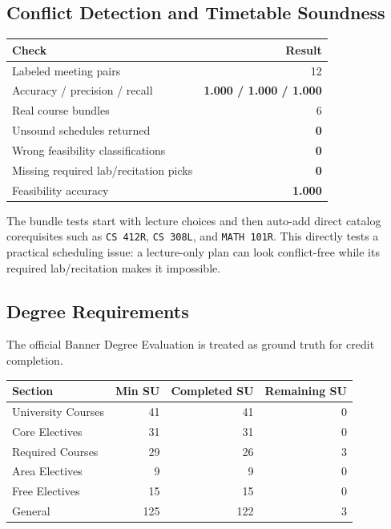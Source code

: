 \documentclass[10pt,letterpaper]{article}
\newcommand{\code}[1]{\texttt{#1}}
\begin{document}
\subsection{Conflict Detection and Timetable Soundness}

\begin{table}[h]
\centering
\small
\begin{tabularx}{0.78\linewidth}{@{}Yr@{}}
\toprule
\textbf{Check} & \textbf{Result} \\
\midrule
Labeled meeting pairs & 12 \\
Accuracy / precision / recall & \textbf{1.000 / 1.000 / 1.000} \\
Real course bundles & 6 \\
Unsound schedules returned & \textbf{0} \\
Wrong feasibility classifications & \textbf{0} \\
Missing required lab/recitation picks & \textbf{0} \\
Feasibility accuracy & \textbf{1.000} \\
\bottomrule
\end{tabularx}
\end{table}

The bundle tests start with lecture choices and then auto-add direct catalog corequisites such as \code{CS 412R}, \code{CS 308L}, and \code{MATH 101R}. This directly tests a practical scheduling issue: a lecture-only plan can look conflict-free while its required lab/recitation makes it impossible.

\subsection{Degree Requirements}
The official Banner Degree Evaluation is treated as ground truth for credit completion.

\begin{table}[h]
\centering
\small
\begin{tabular}{@{}lrrr@{}}
\toprule
\textbf{Section} & \textbf{Min SU} & \textbf{Completed SU} & \textbf{Remaining SU} \\
\midrule
University Courses & 41 & 41 & 0 \\
Core Electives & 31 & 31 & 0 \\
Required Courses & 29 & 26 & 3 \\
Area Electives & 9 & 9 & 0 \\
Free Electives & 15 & 15 & 0 \\
General & 125 & 122 & 3 \\
\bottomrule
\end{tabular}
\end{table}
\end{document}
